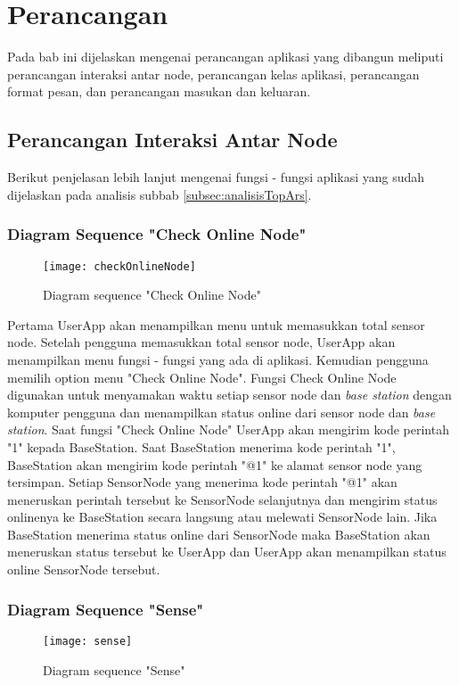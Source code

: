 \chapter{Perancangan}
\label{chap:perancangan}

Pada bab ini dijelaskan mengenai perancangan aplikasi yang dibangun meliputi perancangan
interaksi antar node, perancangan kelas aplikasi, perancangan format pesan, dan perancangan masukan dan keluaran.

\section{Perancangan Interaksi Antar Node}
\label{sec:41}
Berikut penjelasan lebih lanjut mengenai fungsi - fungsi aplikasi yang sudah dijelaskan pada analisis subbab \ref{subsec:analisisTopArs}.
 
\subsection{Diagram Sequence "Check Online Node"}
\begin{figure}[H]
	 
	\texttt{[image: checkOnlineNode]}  
	\caption[Diagram sequence "Check Online Node"]{Diagram sequence "Check Online Node"} 
	\label{fig:checkOnlineNode} 
\end{figure} 

Pertama UserApp akan menampilkan menu untuk memasukkan total sensor node. Setelah pengguna memasukkan total sensor node, UserApp akan menampilkan menu fungsi - fungsi yang ada di aplikasi. Kemudian pengguna memilih option menu "Check Online Node". Fungsi Check Online Node digunakan untuk menyamakan waktu setiap sensor node dan {\it base station} dengan komputer pengguna dan menampilkan status online dari sensor node dan {\it base station}. Saat fungsi "Check Online Node" UserApp akan mengirim kode perintah "1" kepada BaseStation. Saat BaseStation menerima kode perintah "1", BaseStation akan mengirim kode perintah "@1" ke alamat sensor node yang tersimpan. Setiap SensorNode yang menerima kode perintah "@1" akan meneruskan perintah tersebut ke SensorNode selanjutnya dan mengirim status onlinenya ke BaseStation secara langsung atau melewati SensorNode lain. Jika BaseStation menerima status online dari SensorNode maka BaseStation akan meneruskan status tersebut ke UserApp dan UserApp akan menampilkan status online SensorNode tersebut.  
		
\subsection{Diagram Sequence "Sense"}
\begin{figure}[H]
	\texttt{[image: sense]}  
	\caption[Diagram sequence "Sense"]{Diagram sequence "Sense"} 
	\label{fig:sense} 
\end{figure} 

